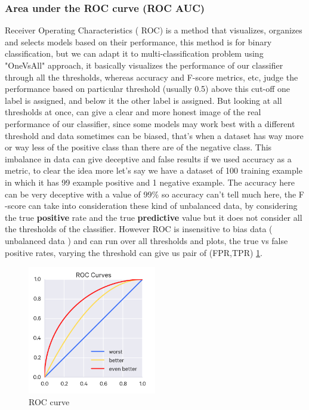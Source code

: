 \subsubsection{Area under the ROC curve (ROC AUC)}


Receiver Operating Characteristics  ( ROC) is a method that visualizes, organizes and selects models based on  their performance,  this method is for binary classification, but we can adapt it to multi-classification problem  using "OneVsAll" approach, it basically  visualizes the performance of our classifier through all the thresholds, whereas accuracy and F-score  metrics, etc, judge the performance based on particular threshold (usually  0.5) above this cut-off one label is assigned, and below it the other label is assigned. But  looking at all thresholds at once, can give a clear and more honest image of the real performance of our classifier,  since  some models may work best with a different threshold and data sometimes can be biased,   that's when  a dataset has way more or way less of the positive class than there are of the negative class. This imbalance in data can give deceptive and false results if we used accuracy as a metric, to clear the idea more let's say we have a dataset of 100 training example in which it  has 99 example positive and 1 negative example.  The accuracy here can be very deceptive with a value of 99\% so accuracy can't tell much here, the F$\textbf{-}$score can take  into consideration these kind of unbalanced data,  by considering  the true \textbf{positive } rate and the true \textbf{predictive} value  but  it does  not consider all the thresholds of the classifier. However  ROC  is insensitive to bias data ( unbalanced data ) and can run over all thresholds and plots, the  true vs false positive rates, varying the threshold can give us pair of (FPR,TPR) \ref{fig:bias2}.


\begin{figure}[H]
\centering
\includegraphics[width=0.5\textwidth]{img/roc.jpg}
\caption{ ROC curve }
\label{fig:bias2}
\end{figure}

